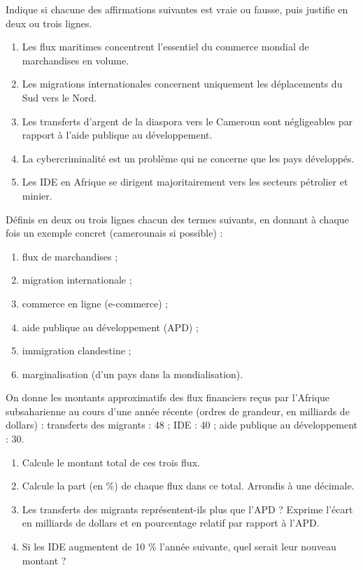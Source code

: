 \documentclass[11pt]{article}
\begin{document}
\begin{exercice}
Indique si chacune des affirmations suivantes est vraie ou fausse, puis justifie en deux ou trois lignes.
\begin{enumerate}
\item Les flux maritimes concentrent l'essentiel du commerce mondial de marchandises en volume.
\item Les migrations internationales concernent uniquement les déplacements du Sud vers le Nord.
\item Les transferts d'argent de la diaspora vers le Cameroun sont négligeables par rapport à l'aide publique au développement.
\item La cybercriminalité est un problème qui ne concerne que les pays développés.
\item Les IDE en Afrique se dirigent majoritairement vers les secteurs pétrolier et minier.
\end{enumerate}
\end{exercice}

\begin{exercice}
Définis en deux ou trois lignes chacun des termes suivants, en donnant à chaque fois un exemple concret (camerounais si possible) :
\begin{enumerate}
\item flux de marchandises ;
\item migration internationale ;
\item commerce en ligne (e-commerce) ;
\item aide publique au développement (APD) ;
\item immigration clandestine ;
\item marginalisation (d'un pays dans la mondialisation).
\end{enumerate}
\end{exercice}

\begin{exercice}
On donne les montants approximatifs des flux financiers reçus par l'Afrique subsaharienne au cours d'une année récente (ordres de grandeur, en milliards de dollars) : transferts des migrants : 48 ; IDE : 40 ; aide publique au développement : 30.
\begin{enumerate}
\item Calcule le montant total de ces trois flux.
\item Calcule la part (en \%) de chaque flux dans ce total. Arrondis à une décimale.
\item Les transferts des migrants représentent-ils plus que l'APD ? Exprime l'écart en milliards de dollars et en pourcentage relatif par rapport à l'APD.
\item Si les IDE augmentent de 10 \% l'année suivante, quel serait leur nouveau montant ?
\end{enumerate}
\end{exercice}
\end{document}
